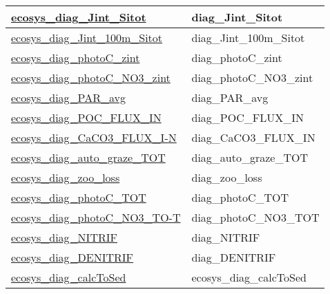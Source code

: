 {\begin{center}
\begin{longtable}{| p{2.0in} | p{4.0in} |}
    \hline
    \hyperref[subsec:var_sec_ecosysDiagFieldsLevel1_ecosys_diag_Jint_Sitot]{ecosys\_diag\_Jint\_Sitot} & diag\_Jint\_Sitot \\
    \hline
    \hyperref[subsec:var_sec_ecosysDiagFieldsLevel1_ecosys_diag_Jint_100m_Sitot]{ecosys\_diag\_Jint\_100m\_Sitot} & diag\_Jint\_100m\_Sitot \\
    \hline
    \hyperref[subsec:var_sec_ecosysDiagFieldsLevel1_ecosys_diag_photoC_zint]{ecosys\_diag\_photoC\_zint} & diag\_photoC\_zint \\
    \hline
    \hyperref[subsec:var_sec_ecosysDiagFieldsLevel1_ecosys_diag_photoC_NO3_zint]{ecosys\_diag\_photoC\_NO3\_zint} & diag\_photoC\_NO3\_zint \\
    \hline
    \hyperref[subsec:var_sec_ecosysDiagFieldsLevel1_ecosys_diag_PAR_avg]{ecosys\_diag\_PAR\_avg} & diag\_PAR\_avg \\
    \hline
    \hyperref[subsec:var_sec_ecosysDiagFieldsLevel1_ecosys_diag_POC_FLUX_IN]{ecosys\_diag\_POC\_FLUX\_IN} & diag\_POC\_FLUX\_IN \\
    \hline
    \hyperref[subsec:var_sec_ecosysDiagFieldsLevel1_ecosys_diag_CaCO3_FLUX_IN]{ecosys\_diag\_CaCO3\_FLUX\_I-}\hyperref[subsec:var_sec_ecosysDiagFieldsLevel1_ecosys_diag_CaCO3_FLUX_IN]{N  }& diag\_CaCO3\_FLUX\_IN \\
    \hline
    \hyperref[subsec:var_sec_ecosysDiagFieldsLevel1_ecosys_diag_auto_graze_TOT]{ecosys\_diag\_auto\_graze\_TOT} & diag\_auto\_graze\_TOT \\
    \hline
    \hyperref[subsec:var_sec_ecosysDiagFieldsLevel1_ecosys_diag_zoo_loss]{ecosys\_diag\_zoo\_loss} & diag\_zoo\_loss \\
    \hline
    \hyperref[subsec:var_sec_ecosysDiagFieldsLevel1_ecosys_diag_photoC_TOT]{ecosys\_diag\_photoC\_TOT} & diag\_photoC\_TOT \\
    \hline
    \hyperref[subsec:var_sec_ecosysDiagFieldsLevel1_ecosys_diag_photoC_NO3_TOT]{ecosys\_diag\_photoC\_NO3\_TO-}\hyperref[subsec:var_sec_ecosysDiagFieldsLevel1_ecosys_diag_photoC_NO3_TOT]{T  }& diag\_photoC\_NO3\_TOT \\
    \hline
    \hyperref[subsec:var_sec_ecosysDiagFieldsLevel1_ecosys_diag_NITRIF]{ecosys\_diag\_NITRIF} & diag\_NITRIF \\
    \hline
    \hyperref[subsec:var_sec_ecosysDiagFieldsLevel1_ecosys_diag_DENITRIF]{ecosys\_diag\_DENITRIF} & diag\_DENITRIF \\
    \hline
    \hyperref[subsec:var_sec_ecosysDiagFieldsLevel1_ecosys_diag_calcToSed]{ecosys\_diag\_calcToSed} & ecosys\_diag\_calcToSed \\

\end{longtable}
\end{center}}

